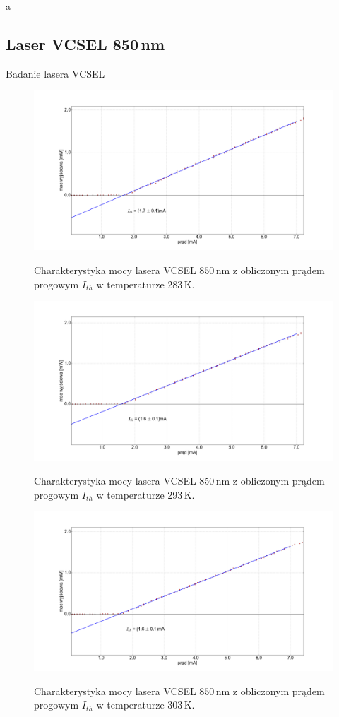 \documentclass[a4paper, portrait,12pt]{report}
\begin{document}
\fi


\newpage
a
\newpage
\subsection{Laser VCSEL 850\,nm}
Badanie lasera VCSEL
\begin{figure}[H]
\center
  \includegraphics[scale=0.30]{plot_vcsel850/temp_10_fit.png}
  \label{rys1}
  \caption{Charakterystyka mocy lasera VCSEL 850\,nm z obliczonym prądem progowym $I_{th}$ w temperaturze 283\,K.} 
\end{figure}

\begin{figure}
\center
  \includegraphics[scale=0.30]{plot_vcsel850/temp_20_fit.png}
  \label{rys1}
  \caption{Charakterystyka mocy lasera VCSEL 850\,nm z obliczonym prądem progowym $I_{th}$ w temperaturze 293\,K.} 
\end{figure}

\begin{figure}
\center
  \includegraphics[scale=0.30]{plot_vcsel850/temp_30_fit.png}
  \label{rys1}
  \caption{Charakterystyka mocy lasera VCSEL 850\,nm z obliczonym prądem progowym $I_{th}$ w temperaturze 303\,K.} 
\end{figure}
\end{document}
